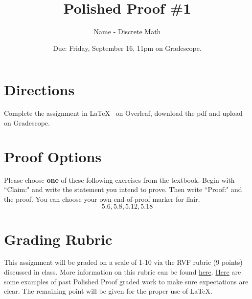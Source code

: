 \documentclass[10pt, leqno]{article}
\title{Polished Proof \#1}
\author{Name - Discrete Math}
\date{Due: Friday, September 16, 11pm on Gradescope.}
\begin{document}
	
\maketitle
	
\section*{Directions}
	
Complete the assignment in \LaTeX ~ on Overleaf, download the pdf and upload on Gradescope. 

	
\section*{Proof Options}
	
Please choose \textbf{one} of these following exercises from the textbook. Begin with ``Claim:" and write the statement you intend to prove. Then write ``Proof:" and the proof. You can choose your own end-of-proof marker for flair. 	
$$ 	5.6, 5.8, 5.12, 5.18 $$ 
	
	
\section*{Grading Rubric}
This assignment will be graded on a scale of 1-10 via the RVF rubric (9 points) discussed in class. More information on this rubric can be found \href{https://drive.google.com/file/d/1P0OBjw-GkX64uCpYcqYmXARapf9MwaiI/view?usp=sharing}{here}. \href{https://drive.google.com/file/d/1KAFQ7GBFpfUkyTBRZ30h5o6nXWwYDSML/view?usp=sharing}{Here} are some examples of past Polished Proof graded work to make sure expectations are clear. The remaining point will be given for the proper use of \LaTeX.
	
\end{document}
